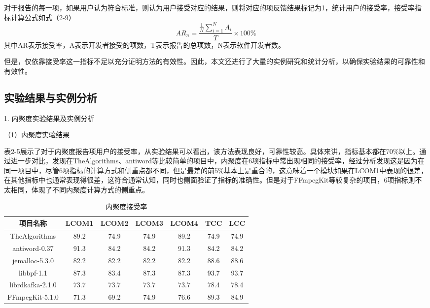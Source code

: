对于报告的每一项，如果用户认为符合标准，则认为用户接受对应的结果，则将对应的项反馈结果标记为1，统计用户的接受率，接受率指标计算公式如式（2-9）
\begin{equation}
    AR_n =  \frac{\frac{1}{N} \sum_{i=1}^{N} A_i}{T} \times 100\%
    \end{equation}
其中AR表示接受率，A表示开发者接受的项数，T表示报告的总项数，N表示软件开发者数。

但是，仅依靠接受率这一指标不足以充分证明方法的有效性。因此，本文还进行了大量的实例研究和统计分析，以确保实验结果的可靠性和有效性。

\subsection{实验结果与实例分析}
1. 内聚度实验结果及实例分析

（1）内聚度实验结果

表2-5展示了对于内聚度报告项用户的接受率，从实验结果可以看出，该方法表现良好，可靠性较高。具体来讲，指标基本都在70\%以上。通过进一步对比，发现在TheAlgorithms、antiword等比较简单的项目中，内聚度在6项指标中常出现相同的接受率，经过分析发现这是因为在同一项目中，尽管6项指标的计算方式和侧重点都不同，但是最差的前5\%基本上是重合的，这意味着一个模块如果在LCOM1中表现的很差，在其他指标中也通常表现得很差，这符合通常认知，同时也侧面验证了指标的准确性。但是对于FFmpegKit等较复杂的项目，6项指标则不太相同，体现了不同内聚度计算方式的侧重点。

\begin{table}[htbp]
\caption{内聚度接受率}
\vspace{0.5em}\centering\wuhao
\begin{tabular}{ccccccc}
\toprule
项目名称 & LCOM1 & LCOM2 & LCOM3 & LCOM4 & TCC & LCC \\
\midrule
TheAlgorithms & 89.2 & 74.9 & 74.9 & 89.2 & 74.9 & 74.9 \\
antiword-0.37  & 91.3 & 84.2 & 84.2 & 91.3 & 84.2 & 84.2 \\
jemalloc-5.3.0 & 82.2 & 82.2 & 82.2 & 82.2 & 88.6 & 88.6 \\
libbpf-1.1 & 87.3 & 83.4 & 87.3 & 87.3 & 93.7 &  93.7 \\
librdkafka-2.1.0 & 73.7 & 73.7 & 73.7 & 73.7 & 78.4 & 78.4 \\
FFmpegKit-5.1.0 & 71.3 & 69.2 & 74.9 & 76.6 & 89.3 & 84.9 \\

\bottomrule
\end{tabular}
\end{table}


